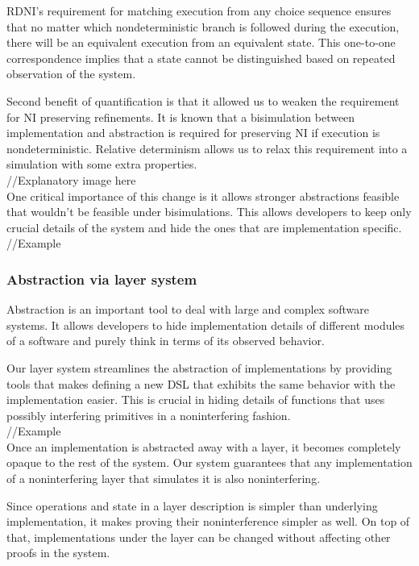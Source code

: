 \documentclass[onecolumn]{paper}
\begin{document}
RDNI's requirement for matching execution from any choice sequence ensures that no matter which nondeterministic branch is followed during the execution, there will be an equivalent execution from an equivalent state. This one-to-one correspondence implies that a state cannot be distinguished based on repeated observation of the system.

Second benefit of quantification is that it allowed us to weaken the requirement for NI preserving refinements. It is known that a bisimulation between implementation and abstraction is required for preserving NI if execution is nondeterministic. Relative determinism allows us to relax this requirement into a simulation with some extra properties. \\

//Explanatory image here\\

One critical importance of this change is it allows stronger abstractions feasible that wouldn't be feasible under bisimulations. This allows developers to keep only crucial details of the system and hide the ones that are implementation specific.\\

//Example\\

\subsubsection*{Abstraction via layer system}
Abstraction is an important tool to deal with large and complex software systems.
It allows developers to hide implementation details of different modules of a software and purely think in terms of its observed behavior.

Our layer system streamlines the abstraction of implementations by providing tools that makes defining a new DSL that exhibits the same behavior with the implementation easier.
This is crucial in hiding details of functions that uses possibly interfering primitives in a noninterfering fashion. \\

//Example\\

Once an implementation is abstracted away with a layer, it becomes completely opaque to the rest of the system. Our system guarantees that any implementation of a noninterfering layer that simulates it is also noninterfering.

Since operations and state in a layer description is simpler than underlying implementation, it makes proving their noninterference simpler as well. On top of that, implementations under the layer can be changed without affecting other proofs in the system.
\end{document}
